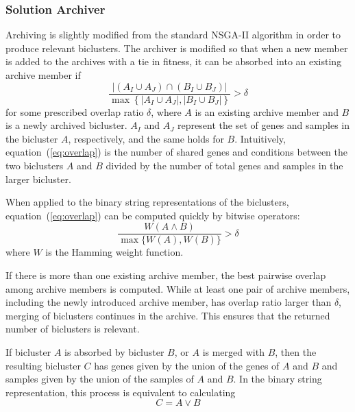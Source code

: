 \subsubsection*{Solution Archiver}
Archiving is slightly modified from the standard NSGA-II algorithm in order to produce relevant biclusters. 
The archiver is modified so that when a new member is added to the archives with a tie in fitness, it can be absorbed into an existing archive member if
\begin{equation} \label{eq:overlap}
	\frac{\left\lvert \left( A_I \cup A_J \right) \cap \left( B_I \cup B_J \right)\right\rvert}
	{\max \left\{ \left\lvert A_I \cup A_J \right\rvert, \left\lvert B_I \cup B_J \right\rvert \right\}} > \delta
\end{equation}
for some prescribed overlap ratio $\delta$, where $A$ is an existing archive member and $B$ is a newly archived bicluster. $A_I$ and $A_J$ represent the set of genes and samples in the bicluster $A$, respectively, and the same holds for $B$. Intuitively, equation~(\ref{eq:overlap}) is the number of shared genes and conditions between the two biclusters $A$ and $B$ divided by the number of total genes and samples in the larger bicluster.

When applied to the binary string representations of the biclusters, equation~(\ref{eq:overlap}) can be computed quickly by bitwise operators:
\begin{equation}
	\frac{W(A \land B)}{\max \{ W(A), W(B)\}} > \delta
\end{equation}
where $W$ is the Hamming weight function.

If there is more than one existing archive member, the best pairwise overlap among archive members is computed. While at least one pair of archive members, including the newly introduced archive member, has overlap ratio larger than $\delta$, merging of biclusters continues in the archive. This ensures that the returned number of biclusters is relevant.

 If bicluster $A$ is absorbed by bicluster $B$, or $A$ is merged with $B$, then the resulting bicluster $C$ has genes given by the union of the genes of $A$ and $B$ and samples given by the union of the samples of $A$ and $B$. In the binary string representation, this process is equivalent to calculating
\begin{equation}
	C = A \lor B
\end{equation}


